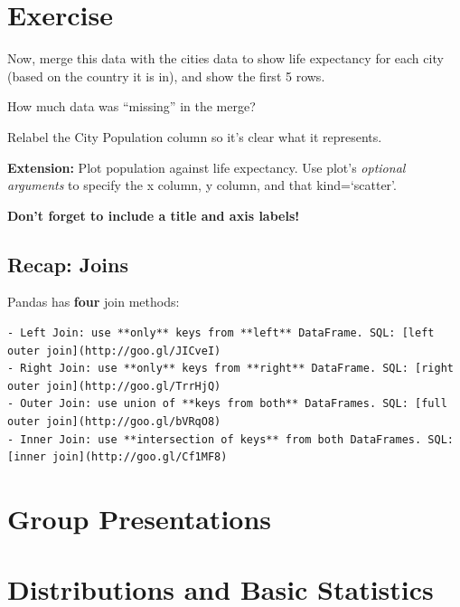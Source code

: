 \documentclass[
  letterpaper,
  DIV=11,
  numbers=noendperiod]{scrreprt}
\begin{document}

\hypertarget{exercise-17}{%
\chapter{Exercise}\label{exercise-17}}

Now, merge this data with the cities data to show life expectancy for
each city (based on the country it is in), and show the first 5 rows.

How much data was ``missing'' in the merge?

Relabel the City Population column so it's clear what it represents.

\textbf{Extension:} Plot population against life expectancy. Use plot's
\emph{optional arguments} to specify the x column, y column, and that
kind=`scatter'.

\textbf{Don't forget to include a title and axis labels!}

\hypertarget{recap-joins}{%
\section{Recap: Joins}\label{recap-joins}}

Pandas has \textbf{four} join methods:

\begin{verbatim}
- Left Join: use **only** keys from **left** DataFrame. SQL: [left outer join](http://goo.gl/JICveI)
- Right Join: use **only** keys from **right** DataFrame. SQL: [right outer join](http://goo.gl/TrrHjQ)
- Outer Join: use union of **keys from both** DataFrames. SQL: [full outer join](http://goo.gl/bVRqO8)
- Inner Join: use **intersection of keys** from both DataFrames. SQL: [inner join](http://goo.gl/Cf1MF8)
\end{verbatim}


\hypertarget{group-presentations}{%
\chapter{Group Presentations}\label{group-presentations}}


\hypertarget{distributions-and-basic-statistics}{%
\chapter{Distributions and Basic
Statistics}\label{distributions-and-basic-statistics}}
\end{document}
